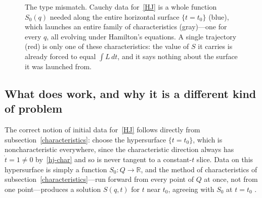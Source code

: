 \begin{figure}[htbp]
\centering
{}
\caption{The type mismatch. Cauchy data for~\eqref{HJ} is a whole function
    $S_0(q)$ needed along the entire horizontal surface $\{t=t_0\}$ (blue),
    which launches an entire family of characteristics (gray)---one for every
    $q$, all evolving under Hamilton's equations. A single trajectory (red) is
    only one of these characteristics: the value of $S$ it carries is already
    forced to equal $\int L\,dt$, and it says nothing about the surface it was
    launched from.}
\label{fig:surface-vs-curve}
\end{figure}

\subsection{What does work, and why it is a different kind of problem}
\label{cauchy}

The correct notion of initial data for~\eqref{HJ} follows directly from
subsection~\ref{characteristics}: choose the hypersurface $\{t=t_0\}$, which is
noncharacteristic everywhere, since the characteristic direction always has
$\dot t=1\neq0$ by~\eqref{hj-char} and so is never tangent to a constant-$t$
slice. Data on this hypersurface is simply a function $S_0:Q\to\mathbb{R}$, and
the method of characteristics of subsection~\ref{characteristics}---run forward
from every point of $Q$ at once, not from one point---produces a solution
$S(q,t)$ for $t$ near $t_0$, agreeing with $S_0$ at $t=t_0$ \cite{evans2010}.

